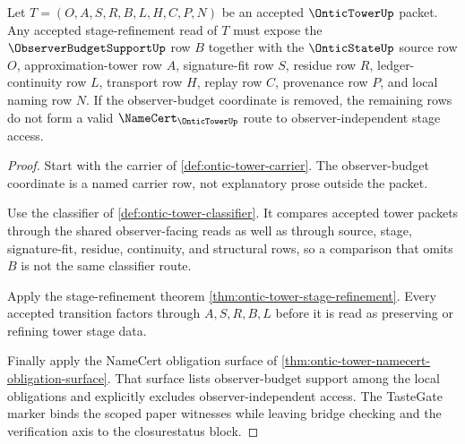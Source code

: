\begin{theorem}
\label{thm:ontic-tower-observer-budget-separation}
Let $T=(O,A,S,R,B,L,H,C,P,N)$ be an accepted $\OnticTowerUp$ packet. Any accepted stage-refinement read of $T$ must expose the $\ObserverBudgetSupportUp$ row $B$ together with the $\OnticStateUp$ source row $O$, approximation-tower row $A$, signature-fit row $S$, residue row $R$, ledger-continuity row $L$, transport row $H$, replay row $C$, provenance row $P$, and local naming row $N$. If the observer-budget coordinate is removed, the remaining rows do not form a valid $\NameCert_{\OnticTowerUp}$ route to observer-independent stage access.
\end{theorem}
\begin{proof}
Start with the carrier of \autoref{def:ontic-tower-carrier}. The observer-budget coordinate is a named carrier row, not explanatory prose outside the packet.

Use the classifier of \autoref{def:ontic-tower-classifier}. It compares accepted tower packets through the shared observer-facing reads as well as through source, stage, signature-fit, residue, continuity, and structural rows, so a comparison that omits $B$ is not the same classifier route.

Apply the stage-refinement theorem \autoref{thm:ontic-tower-stage-refinement}. Every accepted transition factors through $A,S,R,B,L$ before it is read as preserving or refining tower stage data.

Finally apply the NameCert obligation surface of \autoref{thm:ontic-tower-namecert-obligation-surface}. That surface lists observer-budget support among the local obligations and explicitly excludes observer-independent access. The TasteGate marker binds the scoped paper witnesses while leaving bridge checking and the verification axis to the closurestatus block.
\end{proof}

